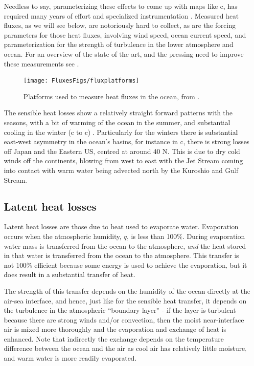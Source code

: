 Needless to say, parameterizing these effects to come up with maps like c, has required many years of effort and specialized instrumentation .  Measured heat fluxes, as we will see below, are notoriously hard to collect, as are the forcing parameters for those heat fluxes, involving wind speed, ocean current speed, and parameterization for the strength of turbulence in the lower atmosphere and ocean.  For an overview of the state of the art, and the pressing need to improve these measurements see \citet{croninetal19}.  

\begin{figure}[htb]
\texttt{[image: FluxesFigs/fluxplatforms]}
 \caption{Platforms used to measure heat fluxes in the ocean, from \citet{croninetal19}.}
  \label{fig:fluxplatforms}
\end{figure}

The sensible heat losses show a relatively straight forward patterns with the seasons, with a bit of warming of the ocean in the summer, and substantial cooling in the winter (c to c) .  Particularly for the winters there is substantial east-west asymmetry in the ocean's basins, for instance in c, there is strong losses off Japan and the Eastern US, centred at around 40 N.  This is due to dry cold winds off the continents, blowing from west to east with the Jet Stream coming into contact with warm water being advected north by the Kuroshio and Gulf Stream.  

\subsection{Latent heat losses}

Latent heat losses are those due to heat used to evaporate water.  Evaporation occurs when the atmospheric humidity, $q$, is less than 100\%.  During evaporation water mass is transferred from the ocean to the atmosphere, \emph{and} the heat stored in that water is transferred from the ocean to the atmosphere.   This transfer is not 100\% efficient because some energy is used to achieve the evaporation, but it does result in a substantial transfer of heat.  

The strength of this transfer depends on the humidity of the ocean directly at the air-sea interface, and hence, just like for the sensible heat transfer, it depends on the turbulence in the atmospheric ``boundary layer'' - if the layer is turbulent because there are strong winds and/or convection, then the moist near-interface air is mixed more thoroughly and the evaporation and exchange of heat is enhanced.   Note that indirectly the exchange depends on the temperature difference between the ocean and the air as cool air has relatively little moisture, and warm water is more readily evaporated.  

